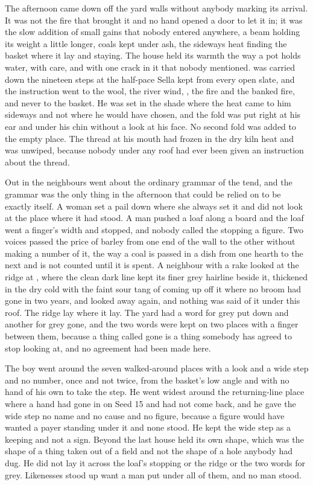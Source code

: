 The afternoon came down off the yard walls without anybody marking its arrival. It was not the fire that brought it and no hand opened a door to let it in; it was the slow addition of small gains that nobody entered anywhere, a beam holding its weight a little longer, coals kept under ash, the sideways heat finding the basket where it lay and staying. The house held its warmth the way a pot holds water, with care, and with one crack in it that nobody mentioned.  was carried down the nineteen steps at the half-pace Sella kept from every open slate, and the instruction went to the wool, the river wind, , the fire and the banked fire, and never to the basket. He was set in the shade where the heat came to him sideways and not where he would have chosen, and the fold was put right at his ear and under his chin without a look at his face. No second fold was added to the empty place. The thread at his mouth had frozen in the dry kiln heat and was unwiped, because nobody under any roof had ever been given an instruction about the thread.

Out in  the neighbours went about the ordinary grammar of the tend, and the grammar was the only thing in the afternoon that could be relied on to be exactly itself. A woman set a pail down where she always set it and did not look at the place where it had stood. A man pushed a loaf along a board and the loaf went a finger's width and stopped, and nobody called the stopping a figure. Two voices passed the price of barley from one end of the wall to the other without making a number of it, the way a coal is passed in a dish from one hearth to the next and is not counted until it is spent. A neighbour with a rake looked at the ridge at , where the clean dark line kept its finer grey hairline beside it, thickened in the dry cold with the faint sour tang of  coming up off it where no broom had gone in two years, and looked away again, and nothing was said of it under this roof. The ridge lay where it lay. The yard had a word for grey put down and another for grey gone, and the two words were kept on two places with a finger between them, because a thing called gone is a thing somebody has agreed to stop looking at, and no agreement had been made here.

The boy went around the seven walked-around places with a look and a wide step and no number, once and not twice, from the basket's low angle and with no hand of his own to take the step. He went widest around the returning-line place where a hand had gone in on Seed 15 and had not come back, and he gave the wide step no name and no cause and no figure, because a figure would have wanted a payer standing under it and none stood. He kept the wide step as a keeping and not a sign. Beyond the last house  held its own shape, which was the shape of a thing taken out of a field and not the shape of a hole anybody had dug. He did not lay it across the loaf's stopping or the ridge or the two words for grey. Likenesses stood up want a man put under all of them, and no man stood.

